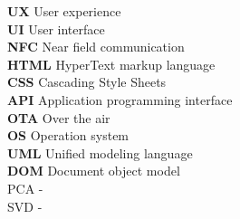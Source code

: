 
\noindent \textbf{UX} User experience \\
\textbf{UI} User interface \\
\textbf{NFC} Near field communication \\
\textbf{HTML} HyperText markup language \\
\textbf{CSS} Cascading Style Sheets \\ 
\textbf{API} Application programming interface \\
\textbf{OTA} Over the air \\
\textbf{OS} Operation system \\
\textbf{UML} Unified modeling language \\
\textbf{DOM} Document object model \\
PCA - \\
SVD - \\



